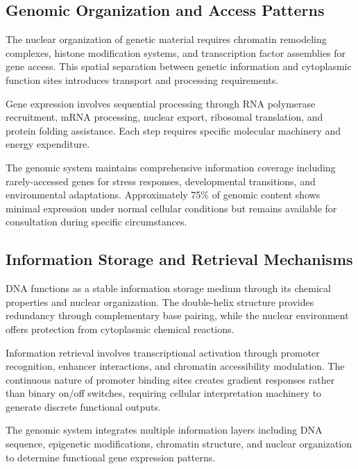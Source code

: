 \subsection{Genomic Organization and Access Patterns}

The nuclear organization of genetic material requires chromatin remodeling complexes, histone modification systems, and transcription factor assemblies for gene access. This spatial separation between genetic information and cytoplasmic function sites introduces transport and processing requirements.

Gene expression involves sequential processing through RNA polymerase recruitment, mRNA processing, nuclear export, ribosomal translation, and protein folding assistance. Each step requires specific molecular machinery and energy expenditure.

The genomic system maintains comprehensive information coverage including rarely-accessed genes for stress responses, developmental transitions, and environmental adaptations. Approximately 75\% of genomic content shows minimal expression under normal cellular conditions but remains available for consultation during specific circumstances.

\subsection{Information Storage and Retrieval Mechanisms}

DNA functions as a stable information storage medium through its chemical properties and nuclear organization. The double-helix structure provides redundancy through complementary base pairing, while the nuclear environment offers protection from cytoplasmic chemical reactions.

Information retrieval involves transcriptional activation through promoter recognition, enhancer interactions, and chromatin accessibility modulation. The continuous nature of promoter binding sites creates gradient responses rather than binary on/off switches, requiring cellular interpretation machinery to generate discrete functional outputs.

The genomic system integrates multiple information layers including DNA sequence, epigenetic modifications, chromatin structure, and nuclear organization to determine functional gene expression patterns.

